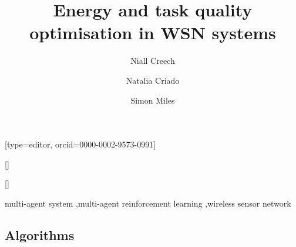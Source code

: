 \documentclass[a4paper,fleqn]{cas-sc}
\begin{document}
	\let\WriteBookmarks\relax
	\def\floatpagepagefraction{1}
	\def\textpagefraction{.001}
	
	\title [mode = title]{Energy and task quality optimisation in WSN systems}                      
	
	\author[1]{Niall Creech}[type=editor,	orcid=0000-0002-9573-0991]
	
	\author[1]{Natalia Criado}[]

	\author[1]{Simon Miles}[]

	\address[1]{Department of Informatics, King's College London, Bush House, Strand Campus, 30, Aldwych, London WC2B 4BG}

	
	
	
	\begin{keywords}
		multi-agent system
		\sep multi-agent reinforcement learning
		\sep wireless sensor network
	\end{keywords}

	
	
	
	\newtheorem{thm}{Theorem}
	\maketitle
	
	
	
	
	
	

	
	
	
	
	
	
	
	
	
	
	
	
	
	\begin{appendix}
	\section{Algorithms}
	\label{appendix:algorithms}
	
	
	\end{appendix}
				
\end{document}
